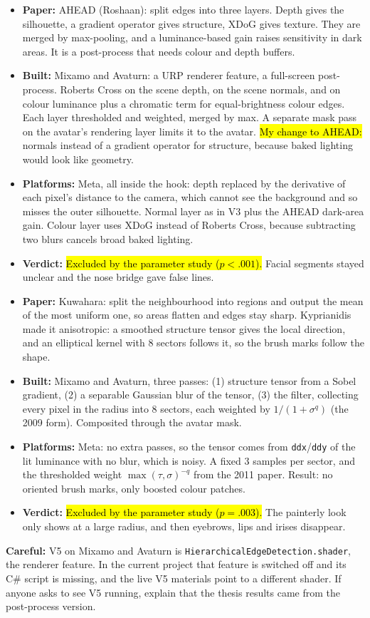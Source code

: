 \documentclass[11pt,a4paper]{article}
\newcommand{\key}[1]{\hl{#1}}
\newcommand{\tech}[5]{\needspace{10\baselineskip}\vspace{0.6em}{\bfseries #1}\par\vspace{0.1em}\begin{itemize}[leftmargin=1.2em,itemsep=0.05em,topsep=0.1em]\small\item\textbf{Paper:} #2 \item\textbf{Built:} #3 \item\textbf{Platforms:} #4 \item\textbf{Verdict:} #5\end{itemize}}
\newcommand{\careful}[1]{{\color{knred}\textbf{Careful:} #1}\par}
\begin{document}
\tech{V5 — Hierarchical Edge Detection with Multiple Cues}
{AHEAD (Roshaan): split edges into three layers. Depth gives the silhouette, a gradient operator gives structure, XDoG gives texture. They are merged by max-pooling, and a luminance-based gain raises sensitivity in dark areas. It is a post-process that needs colour and depth buffers.}
{Mixamo and Avaturn: a URP renderer feature, a full-screen post-process. Roberts Cross on the scene depth, on the scene normals, and on colour luminance plus a chromatic term for equal-brightness colour edges. Each layer thresholded and weighted, merged by max. A separate mask pass on the avatar's rendering layer limits it to the avatar. \key{My change to AHEAD:} normals instead of a gradient operator for structure, because baked lighting would look like geometry.}
{Meta, all inside the hook: depth replaced by the derivative of each pixel's distance to the camera, which cannot see the background and so misses the outer silhouette. Normal layer as in V3 plus the AHEAD dark-area gain. Colour layer uses XDoG instead of Roberts Cross, because subtracting two blurs cancels broad baked lighting.}
{\key{Excluded by the parameter study ($p<.001$).} Facial segments stayed unclear and the nose bridge gave false lines.}

\tech{V6 — Kuwahara Painterly Filter}
{Kuwahara: split the neighbourhood into regions and output the mean of the most uniform one, so areas flatten and edges stay sharp. Kyprianidis made it anisotropic: a smoothed structure tensor gives the local direction, and an elliptical kernel with 8 sectors follows it, so the brush marks follow the shape.}
{Mixamo and Avaturn, three passes: (1) structure tensor from a Sobel gradient, (2) a separable Gaussian blur of the tensor, (3) the filter, collecting every pixel in the radius into 8 sectors, each weighted by $1/(1+\sigma^q)$ (the 2009 form). Composited through the avatar mask.}
{Meta: no extra passes, so the tensor comes from \texttt{ddx}/\texttt{ddy} of the lit luminance with no blur, which is noisy. A fixed 3 samples per sector, and the thresholded weight $\max(\tau,\sigma)^{-q}$ from the 2011 paper. Result: no oriented brush marks, only boosted colour patches.}
{\key{Excluded by the parameter study ($p=.003$).} The painterly look only shows at a large radius, and then eyebrows, lips and irises disappear.}

\careful{V5 on Mixamo and Avaturn is \texttt{HierarchicalEdgeDetection.shader}, the renderer feature. In the current project that feature is switched off and its C\# script is missing, and the live V5 materials point to a different shader. If anyone asks to see V5 running, explain that the thesis results came from the post-process version.}
\end{document}
